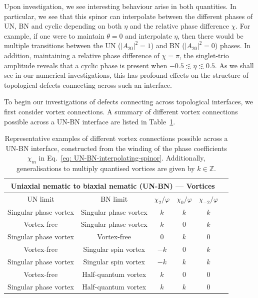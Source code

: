Upon investigation, we see interesting behaviour arise in both quantities.
In particular, we see that this spinor can interpolate between the different
phases of UN, BN and cyclic depending on both \(\eta \) and the relative phase
difference \(\chi \).
For example, if one were to maintain \(\theta=0\) and interpolate \(\eta \),
then there would be multiple transitions between the UN (\(|A_{20}|^2 = 1\)) and
BN (\(|A_{20}|^2 = 0\)) phases.
In addition, maintaining a relative phase difference of \(\chi=\pi \), the
singlet-trio amplitude reveals that a cyclic phase is present when
\(-0.5 \lesssim \eta \lesssim 0.5\).
As we shall see in our numerical investigations, this has profound effects on
the structure of topological defects connecting across such an interface.

To begin our investigations of defects connecting across topological interfaces,
we first consider vortex connections.
A summary of different vortex connections possible across a UN-BN interface are
listed in Table~\ref{tab: UN-BN-vortices}.
\begin{table}
    \centering
    \begin{tabular}{cccccc}
        \toprule
        \multicolumn{5}{c}{Uniaxial nematic to biaxial nematic (UN-BN) ---
        Vortices} \\
        \midrule
        UN limit & BN limit &  \(\chi_2/\varphi \) & \(\chi_0/\varphi \) &
        \(\chi_{-2}/\varphi \)  \\
        \midrule
         Singular phase vortex & Singular phase vortex & \(k\) & \(k\) &
         \(k\) \\ 
         Vortex-free & Singular phase vortex & \(k\) & 0 & \(k\) \\
         Singular phase vortex & Vortex-free & 0 & \(k\) & 0\\
         Vortex-free & Singular spin vortex  & \(-k\) & 0 & \(k\) \\
         Singular phase vortex & Singular spin vortex  & \(-k\) & \(k\) &
         \(k\) \\
         Vortex-free & Half-quantum vortex  & \(k\) & 0 & 0\\
         Singular phase vortex & Half-quantum vortex  & \(k\) & \(k\) & 0 \\
        \bottomrule
    \end{tabular}
    \caption{\label{tab: UN-BN-vortices}
    Representative examples of different vortex connections possible across a
    UN-BN interface, constructed from the winding of the phase coefficients
    \(\chi_m\) in Eq.~\eqref{eq: UN-BN-interpolating-spinor}.
    Additionally, generalisations to multiply quantised vortices are given by
    \(k \in \mathbb{Z}\).}
\end{table}
